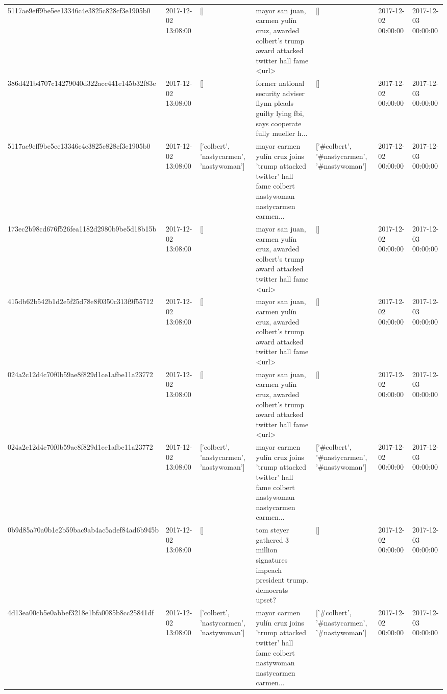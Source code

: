 \begin{tabular}{lllllll}
5117ae9eff9be5ee13346c4e3825c828cf3e1905b0 & 2017-12-02 13:08:00 & [] & mayor san juan, carmen yulín cruz, awarded colbert's trump award attacked twitter hall fame <url> & [] & 2017-12-02 00:00:00 & 2017-12-03 00:00:00 \\
386d421b4707c14279040d322acc441e145b32f83e & 2017-12-02 13:08:00 & [] & former national security adviser flynn pleads guilty lying fbi, says cooperate fully mueller h... & [] & 2017-12-02 00:00:00 & 2017-12-03 00:00:00 \\
5117ae9eff9be5ee13346c4e3825c828cf3e1905b0 & 2017-12-02 13:08:00 & ['colbert', 'nastycarmen', 'nastywoman'] & mayor carmen yulín cruz joins 'trump attacked twitter' hall fame colbert nastywoman nastycarmen carmen... & ['#colbert', '#nastycarmen', '#nastywoman'] & 2017-12-02 00:00:00 & 2017-12-03 00:00:00 \\
173ec2b98cd676f526fea1182d2980b9be5d18b15b & 2017-12-02 13:08:00 & [] & mayor san juan, carmen yulín cruz, awarded colbert's trump award attacked twitter hall fame <url> & [] & 2017-12-02 00:00:00 & 2017-12-03 00:00:00 \\
415db62b542b1d2e5f25d78e8f0350c313f9f55712 & 2017-12-02 13:08:00 & [] & mayor san juan, carmen yulín cruz, awarded colbert's trump award attacked twitter hall fame <url> & [] & 2017-12-02 00:00:00 & 2017-12-03 00:00:00 \\
024a2c12d4c70f0b59ae8f829d1ce1afbe11a23772 & 2017-12-02 13:08:00 & [] & mayor san juan, carmen yulín cruz, awarded colbert's trump award attacked twitter hall fame <url> & [] & 2017-12-02 00:00:00 & 2017-12-03 00:00:00 \\
024a2c12d4c70f0b59ae8f829d1ce1afbe11a23772 & 2017-12-02 13:08:00 & ['colbert', 'nastycarmen', 'nastywoman'] & mayor carmen yulín cruz joins 'trump attacked twitter' hall fame colbert nastywoman nastycarmen carmen... & ['#colbert', '#nastycarmen', '#nastywoman'] & 2017-12-02 00:00:00 & 2017-12-03 00:00:00 \\
0b9d85a70a0b1e2b59bac9ab4ac5adef84ad6b945b & 2017-12-02 13:08:00 & [] & tom steyer gathered 3 million signatures impeach president trump. democrats upset? & [] & 2017-12-02 00:00:00 & 2017-12-03 00:00:00 \\
4d13ea00cb5e0abbef3218e1bfa0085b8cc25841df & 2017-12-02 13:08:00 & ['colbert', 'nastycarmen', 'nastywoman'] & mayor carmen yulín cruz joins 'trump attacked twitter' hall fame colbert nastywoman nastycarmen carmen... & ['#colbert', '#nastycarmen', '#nastywoman'] & 2017-12-02 00:00:00 & 2017-12-03 00:00:00 \\

\end{tabular}
